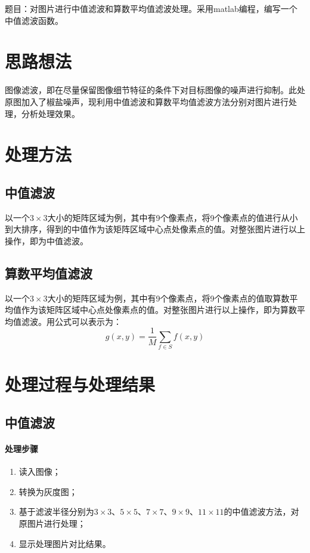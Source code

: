 \documentclass[UTF8]{article}
\begin{document}
\begin{titlepage}

\end{titlepage}

\noindent 题目：对图片进行中值滤波和算数平均值滤波处理。采用matlab编程，编写一个中值滤波函数。
%
\section{思路想法}
图像滤波，即在尽量保留图像细节特征的条件下对目标图像的噪声进行抑制。此处原图加入了椒盐噪声，现利用中值滤波和算数平均值滤波方法分别对图片进行处理，分析处理效果。

%
\section{处理方法}
\subsection{中值滤波}
以一个$3 \times 3$大小的矩阵区域为例，其中有9个像素点，将9个像素点的值进行从小到大排序，得到的中值作为该矩阵区域中心点处像素点的值。对整张图片进行以上操作，即为中值滤波。

\subsection{算数平均值滤波}
以一个$3 \times 3$大小的矩阵区域为例，其中有9个像素点，将9个像素点的值取算数平均值作为该矩阵区域中心点处像素点的值。对整张图片进行以上操作，即为算数平均值滤波。用公式可以表示为：
$$
g(x, y) = \frac{1}{M}\sum_{f \in S} f(x, y)
$$

%
\section{处理过程与处理结果}
\subsection{中值滤波}
\paragraph{处理步骤}
\begin{enumerate}
    \item 读入图像；
    \item 转换为灰度图；
    \item 基于滤波半径分别为$3 \times 3$、$5 \times 5$、$7 \times 7$、$9 \times 9$、$11 \times 11$的中值滤波方法，对原图片进行处理；
    \item 显示处理图片对比结果。
\end{enumerate}
\end{document}
